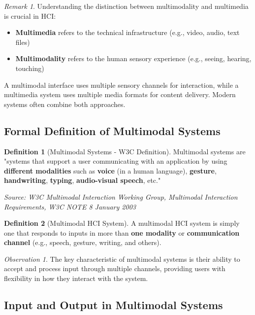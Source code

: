\documentclass[11pt,a4paper]{article}
\theoremstyle{definition}
\newtheorem{definition}{Definition}[section]
\theoremstyle{plain}
\theoremstyle{remark}
\newtheorem*{remark}{Remark}
\newtheorem*{observation}{Observation}
\begin{document}
\begin{remark}
Understanding the distinction between multimodality and multimedia is crucial in HCI:
\begin{itemize}
    \item \textbf{Multimedia} refers to the technical infrastructure (e.g., video, audio, text files)
    \item \textbf{Multimodality} refers to the human sensory experience (e.g., seeing, hearing, touching)
\end{itemize}

A multimodal interface uses multiple sensory channels for interaction, while a multimedia system uses multiple media formats for content delivery. Modern systems often combine both approaches.
\end{remark}

\subsection{Formal Definition of Multimodal Systems}

\begin{definition}[Multimodal Systems - W3C Definition]
Multimodal systems are "systems that support a user communicating with an application by using \textbf{different modalities} such as \textbf{voice} (in a human language), \textbf{gesture}, \textbf{handwriting}, \textbf{typing}, \textbf{audio-visual speech}, etc."

\vspace{0.2cm}
\textit{Source: W3C Multimodal Interaction Working Group, Multimodal Interaction Requirements, W3C NOTE 8 January 2003}
\end{definition}

\begin{definition}[Multimodal HCI System]
A multimodal HCI system is simply one that responds to inputs in more than \textbf{one modality} or \textbf{communication channel} (e.g., speech, gesture, writing, and others).
\end{definition}

\begin{observation}
The key characteristic of multimodal systems is their ability to accept and process input through multiple channels, providing users with flexibility in how they interact with the system.
\end{observation}

\subsection{Input and Output in Multimodal Systems}
\end{document}

